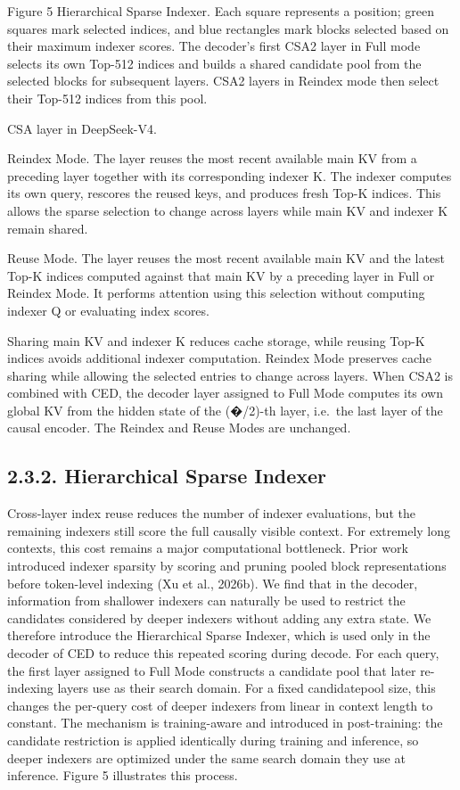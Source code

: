 \documentclass[
  10
]{article}
\begin{document}
Figure 5 \textbar{} Hierarchical Sparse Indexer. Each square represents
a position; green squares mark selected indices, and blue rectangles
mark blocks selected based on their maximum indexer scores. The
decoder's first CSA2 layer in Full mode selects its own Top-512 indices
and builds a shared candidate pool from the selected blocks for
subsequent layers. CSA2 layers in Reindex mode then select their Top-512
indices from this pool.

CSA layer in DeepSeek-V4.

Reindex Mode. The layer reuses the most recent available main KV from a
preceding layer together with its corresponding indexer K. The indexer
computes its own query, rescores the reused keys, and produces fresh
Top-K indices. This allows the sparse selection to change across layers
while main KV and indexer K remain shared.

Reuse Mode. The layer reuses the most recent available main KV and the
latest Top-K indices computed against that main KV by a preceding layer
in Full or Reindex Mode. It performs attention using this selection
without computing indexer Q or evaluating index scores.

Sharing main KV and indexer K reduces cache storage, while reusing Top-K
indices avoids additional indexer computation. Reindex Mode preserves
cache sharing while allowing the selected entries to change across
layers. When CSA2 is combined with CED, the decoder layer assigned to
Full Mode computes its own global KV from the hidden state of the
(�/2)-th layer, i.e.~the last layer of the causal encoder. The Reindex
and Reuse Modes are unchanged.

\subsection{2.3.2. Hierarchical Sparse
Indexer}\label{hierarchical-sparse-indexer}

Cross-layer index reuse reduces the number of indexer evaluations, but
the remaining indexers still score the full causally visible context.
For extremely long contexts, this cost remains a major computational
bottleneck. Prior work introduced indexer sparsity by scoring and
pruning pooled block representations before token-level indexing (Xu et
al., 2026b). We find that in the decoder, information from shallower
indexers can naturally be used to restrict the candidates considered by
deeper indexers without adding any extra state. We therefore introduce
the Hierarchical Sparse Indexer, which is used only in the decoder of
CED to reduce this repeated scoring during decode. For each query, the
first layer assigned to Full Mode constructs a candidate pool that later
re-indexing layers use as their search domain. For a fixed candidatepool
size, this changes the per-query cost of deeper indexers from linear in
context length to constant. The mechanism is training-aware and
introduced in post-training: the candidate restriction is applied
identically during training and inference, so deeper indexers are
optimized under the same search domain they use at inference. Figure 5
illustrates this process.
\end{document}

